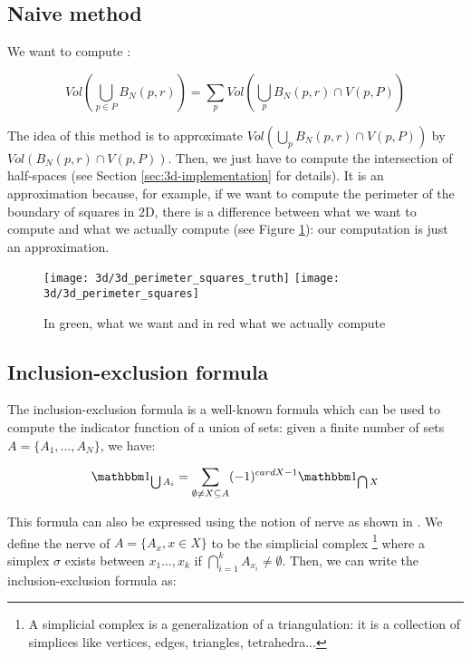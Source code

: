 \subsection{Naive method}
We want to compute :

\begin{equation}
    Vol(\bigcup_{p \in P} B_N(p, r)) = \sum_p Vol(\bigcup_p B_N(p, r) \cap V(p, P))
\end{equation}

The idea of this method is to approximate $ Vol(\bigcup_p B_N(p, r) \cap V(p,
P)) $ by $ Vol(B_N(p, r) \cap V(p, P)) $. Then, we just have to compute the
intersection of half-spaces (see Section \ref{sec:3d-implementation} for
details). It is an approximation because, for example, if we want to compute the
perimeter of the boundary of squares in 2D, there is a difference between what
we want to compute and what we actually compute (see Figure
\ref{fig:3d-inclusion-exclusion-squares}): our computation is just an
approximation.

\begin{figure}[h]
    \centering

    \texttt{[image: 3d/3d\_perimeter\_squares\_truth]}
    \hspace{2cm}
    \texttt{[image: 3d/3d\_perimeter\_squares]}
    \caption{In green, what we want and in red what we actually compute}
    \label{fig:3d-inclusion-exclusion-squares}
\end{figure}

\subsection{Inclusion-exclusion formula}

The inclusion-exclusion formula is a well-known formula which can be used to
compute the indicator function of a union of sets: given a finite number of sets
$ A = \{ A_1, \ldots, A_N \} $, we have:

\begin{equation}
    \indicator{\bigcup A_i} = \sum_{\emptyset \neq X \subseteq A} (-1)^{card X -
        1} \indicator{\bigcap X}
\end{equation}

This formula can also be expressed using the notion of nerve as shown in
\cite{attali2007inclusion}. We define the nerve of $ A = \{ A_x, x \in X \} $ to
be the simplicial complex \footnote{A simplicial complex is a generalization of
    a triangulation: it is a collection of simplices like vertices, edges,
    triangles, tetrahedra...} where a simplex $ \sigma $ exists between $ x_1
\ldots, x_k $ if $ \bigcap\limits_{i=1}^k A_{x_i} \neq \emptyset $. Then, we can
write the inclusion-exclusion formula as:

